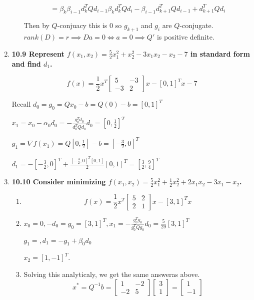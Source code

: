 \documentclass[10pt,a4paper]{article}
\begin{document}
\begin{enumerate}
\begin{enumerate}
        $$ = \beta_k\beta_{i-1} d_k^TQd_{i-1}   \beta_k d_k^TQd_{i} - \beta_{i-1} d_{k+1}^TQd_{i-1} + d_{k+1}^TQd_i$$

        Then by $Q$-conjuacy this is 0 so $g_{k+1}$ and $g_i$ are $Q$-conjugate. $rank(D) = r \implies Da = 0 \iff a =0 \implies Q'$ is positive definite.

    \end{enumerate}

    \item \textbf{10.9 Represent $f(x_1, x_2) = \frac{5}{2}x_1^2 +x_2^2 - 3x_1x_2 -x_2 -7$ in standard form and find $d_1$.}
    
    $$f(x) = \frac{1}{2}x^T\begin{bmatrix} 5 & -3 \\ -3 & 2\end{bmatrix}x - [0, 1]^Tx - 7$$
    
    Recall $d_0 = g_0 = Qx_0-b = Q(0) - b = [0, 1]^T$

    $x_1 = x_0 - \alpha_0 d_0 = -\frac{g_0^Td_0}{d_0^TQd_0} d_0=[0, \frac{1}{2}]^T$

    $g_1 = \nabla f(x_1) = Q[0, \frac{1}{2}] -b = [-\frac{3}{2}, 0]^T$

    $d_1 = -[-\frac{3}{2}, 0]^T + \frac{[-\frac{3}{2}, 0]^T[0, 1]}{2} [0,1]^T = [\frac{3}{2}, \frac{9}{4}]^T$

    \item \textbf{10.10 Consider minimizing $f(x_1, x_2) = \frac{5}{2}x_1^2 +\frac{1}{2}x_2^2 + 2x_1x_2 -3x_1 - x_2$.} 
    \begin{enumerate}
        \item $$f(x) = \frac{1}{2}x^T\begin{bmatrix} 5 & 2 \\ 2 & 1\end{bmatrix}x - [3, 1]^Tx$$
        \item $x_0 = 0, -d_0 = g_0 = [3, 1]^T, x_1 = -\frac{g_0^Tg_0}{g_0^TQg_0} d_0 = \frac{5}{29}[3, 1]^T$
        
        $g_1 = ,d_1 = - g_1+ \beta_0 d_0 $

        $x_2 = [1, -1]^T$.

        \item Solving this analyticaly, we get the same answeras above.
        $$x^* = Q^{-1}b = \begin{bmatrix} 1 & -2 \\ -2 & 5\end{bmatrix} \begin{bmatrix} 3 \\ 1\end{bmatrix} = \begin{bmatrix} 1 \\ -1 \end{bmatrix}$$
    \end{enumerate}


\end{enumerate}
\end{document}
